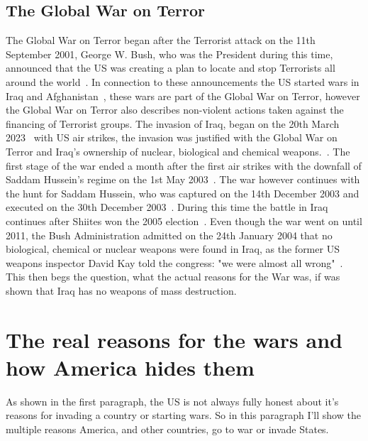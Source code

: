 \documentclass[12pt,a4paper]{article}
\begin{document}
		\subsection{The Global War on Terror}
		The Global War on Terror began after the Terrorist attack on the 11th September 2001, George W. Bush, who was the President during this time, announced that the US was creating a plan to locate and stop Terrorists all around the world~\cite{gowt-bushlibrary}. In connection to these announcements the US started wars in Iraq and Afghanistan~\cite{gowt-bushlibrary}, these wars are part of the Global War on Terror, however the Global War on Terror also describes non-violent actions taken against the financing of Terrorist groups.
		The invasion of Iraq, began on the 20th March 2023~\cite{cfr-iraq-war} with US air strikes, the invasion was justified with the Global War on Terror and Iraq's ownership of nuclear, biological and chemical weapons.~\cite{britannica-iraq-war}. The first stage of the war ended a month after the first air strikes with the downfall of Saddam Hussein's regime on the 1st May 2003~\cite{cfr-iraq-war}. 
		The war however continues with the hunt for Saddam Hussein, who was captured on the 14th December 2003 and executed on the 30th December 2003~\cite{cfr-iraq-war}. During this time the battle in Iraq continues after Shiites won the 2005 election~\cite{cfr-iraq-war}.
		Even though the war went on until 2011, the Bush Administration admitted on the 24th January 2004 that no biological, chemical or nuclear weapons were found in Iraq, as the former US weapons inspector David Kay told the congress: "we were almost all wrong"~\cite{cnn-david-kay-senate-hearing}.
		This then begs the question, what the actual reasons for the War was, if was shown that Iraq has no weapons of mass destruction.
	\section{The real reasons for the wars and how America hides them}
		As shown in the first paragraph, the US is not always fully honest about it's reasons for invading a country or starting wars. So in this paragraph I'll show the multiple reasons America, and other countries, go to war or invade States.
\end{document}
